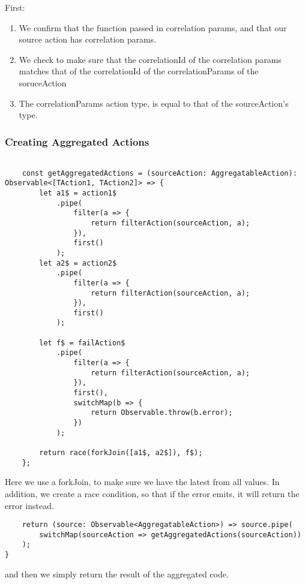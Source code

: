 First:
\begin{enumerate}
  \item We confirm that the function passed in correlation params, and that our
source action has correlation params.
  \item We check to make sure that the correlationId of the correlation params
  matches that of the correlationId of the correlationParams of the soruceAction
  \item The correlationParams action type, is equal to that of the
  sourceAction's type.
\end{enumerate}

\subsubsection{ Creating Aggregated Actions }
\begin{lstlisting}

    const getAggregatedActions = (sourceAction: AggregatableAction): Observable<[TAction1, TAction2]> => {
        let a1$ = action1$
            .pipe(
                filter(a => {
                    return filterAction(sourceAction, a);
                }),
                first()
            );
        let a2$ = action2$
            .pipe(
                filter(a => {
                    return filterAction(sourceAction, a);
                }),
                first()
            );

        let f$ = failAction$
            .pipe(
                filter(a => {
                    return filterAction(sourceAction, a);
                }),
                first(),
                switchMap(b => {
                    return Observable.throw(b.error);
                })
            );

        return race(forkJoin([a1$, a2$]), f$);
    };
\end{lstlisting}

Here we use a forkJoin, to make sure we have the latest from all values. In
addition, we create a race condition, so that if the error emits, it will
return the error instead.

\begin{lstlisting}
    return (source: Observable<AggregatableAction>) => source.pipe(
        switchMap(sourceAction => getAggregatedActions(sourceAction))
    );
}
\end{lstlisting}

and then we simply return the result of the aggregated code. 

